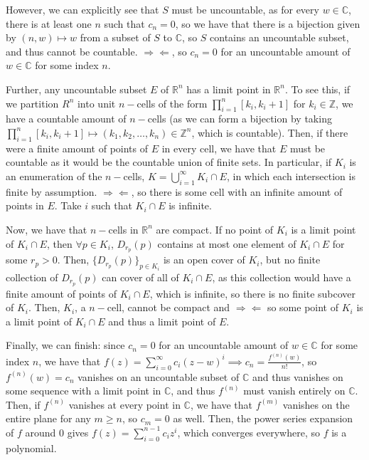 \documentclass[12pt,letterpaper]{article}
\theoremstyle{definition}
\newcommand{\contra}{\Rightarrow\!\Leftarrow}
\newcommand{\R}{\mathbb{R}}
\newcommand{\Z}{\mathbb{Z}}
\newcommand{\C}{\mathbb{C}}
\begin{document}
However, we can explicitly see that $S$ must be uncountable, as for every $w \in \C$, there is at least one $n$ such that $c_{n} = 0$, so we have that there is a bijection given by $(n,w) \mapsto w$ from a subset of $S$ to $\C$, so $S$ contains an uncountable subset, and thus cannot be countable. $\contra$, so $c_{n} = 0$ for an uncountable amount of $w \in \C$ for some index $n$.

Further, any uncountable subset $E$ of $\R^{n}$ has a limit point in $\R^{n}$. To see this, if we partition $R^{n}$ into unit $n-$cells of the form $\prod_{i=1}^{n}[k_{i}, k_{i} + 1]$ for $k_{i} \in \Z$, we have a countable amount of $n-$cells (as we can form a bijection by taking $\prod_{i=1}^{n}[k_{i}, k_{i} + 1] \mapsto (k_{1}, k_{2}, \dots, k_{n}) \in \Z^{n}$, which is countable). Then, if there were a finite amount of points of $E$ in every cell, we have that $E$ must be countable as it would be the countable union of finite sets. In particular, if $K_{i}$ is an enumeration of the $n-$cells, $K = \bigcup_{i=1}^{\infty}K_{i} \cap E$, in which each intersection is finite by assumption. $\contra$, so there is some cell with an infinite amount of points in $E$. Take $i$ such that $K_{i} \cap E$ is infinite.

Now, we have that $n-$cells in $\R^{n}$ are compact. If no point of $K_{i}$ is a limit point of $K_{i} \cap E$, then $\forall p \in K_{i}$, $D_{r_{p}}(p)$ contains at most one element of $K_{i} \cap E$ for some $r_{p} > 0$. Then, $\{D_{r_{p}}(p)\}_{p \in K_{i}}$ is an open cover of $K_{i}$, but no finite collection of $D_{r_{p}}(p)$ can cover of all of $K_{i} \cap E$, as this collection would have a finite amount of points of $K_{i} \cap E$, which is infinite, so there is no finite subcover of $K_{i}$. Then, $K_{i}$, a $n-$cell, cannot be compact and $\contra$ so some point of $K_{i}$ is a limit point of $K_{i} \cap E$ and thus a limit point of $E$.

Finally, we can finish: since $c_{n} = 0$ for an uncountable amount of $w \in \C$ for some index $n$, we have that $f(z) = \sum_{i=0}^{\infty}c_{i}(z-w)^{i} \implies c_{n} = \frac{f^{(n)}(w)}{n!}$, so $f^{(n)}(w) = c_{n}$ vanishes on an uncountable subset of $\C$ and thus vanishes on some sequence with a limit point in $\C$, and thus $f^{(n)}$ must vanish entirely on $\C$. Then, if $f^{(n)}$ vanishes at every point in $\C$, we have that $f^{(m)}$ vanishes on the entire plane for any $m \geq n$, so $c_{m} = 0$ as well. Then, the power series expansion of $f$ around $0$ gives $f(z) = \sum_{i=0}^{n-1}c_{i}z^{i}$, which converges everywhere, so $f$ is a polynomial.
\end{document}
